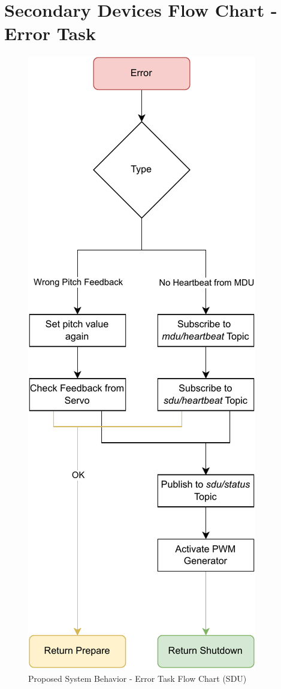 
\chapter{Secondary Devices Flow Chart - Error Task} %

\label{AppendixG}

\begin{figure}[H]
    \centering
    \includegraphics[scale=0.75]{appendices/assets/SDU_ERROR.pdf}
    \caption{Proposed System Behavior - Error Task Flow Chart (SDU)}
    \label{fig:SDU_ERROR}
\end{figure}

